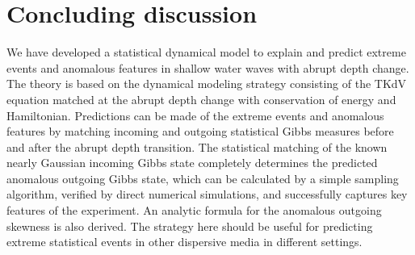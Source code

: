 \documentclass[9pt,twocolumn,twoside,lineno]{pnas-new}
\begin{document}
\begin{itemize}

\end{itemize}

\section{Concluding discussion}

We have developed a statistical dynamical model to explain and predict
extreme events and anomalous features in shallow water waves with
abrupt depth change. The theory is based on the dynamical modeling
strategy consisting of the TKdV equation matched at the abrupt depth
change with conservation of energy and Hamiltonian. Predictions can
be made of the extreme events and anomalous features by matching incoming
and outgoing statistical Gibbs measures before and after the abrupt
depth transition. The statistical matching of the known nearly Gaussian
incoming Gibbs state completely determines the predicted anomalous
outgoing Gibbs state, which can be calculated by a simple sampling
algorithm, verified by direct numerical simulations, and successfully
captures key features of the experiment. An analytic formula for the
anomalous outgoing skewness is also derived. The strategy here should
be useful for predicting extreme statistical events in other dispersive
media in different settings.



\showacknow %

\pnasbreak


\end{document}
